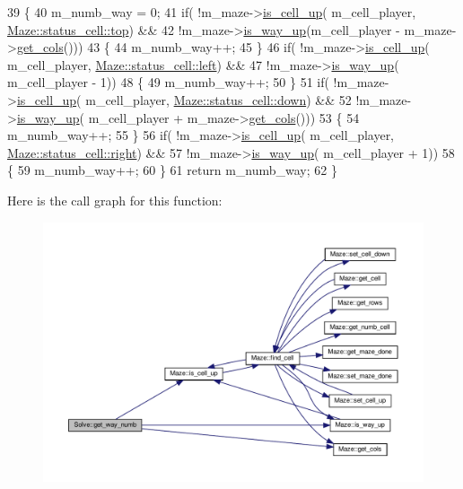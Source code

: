 \begin{DoxyCode}
39 \{
40     m\_numb\_way = 0;
41     \textcolor{keywordflow}{if}( !m\_maze->\hyperlink{classMaze_a2b0e69e72d6c3e1037578f057946a21e}{is\_cell\_up}( m\_cell\_player, \hyperlink{classMaze_a07167e321eac2b67100fb82ecb98f1d1ab28354b543375bfa94dabaeda722927f}{Maze::status\_cell::top}) &&
42             !m\_maze->\hyperlink{classMaze_a308fa695665de6217c0e7f28aab5adda}{is\_way\_up}(m\_cell\_player - m\_maze->\hyperlink{classMaze_a8a04cd1335e96a80358181afa164d4c9}{get\_cols}()))
43     \{
44         m\_numb\_way++;
45     \}
46     \textcolor{keywordflow}{if}( !m\_maze->\hyperlink{classMaze_a2b0e69e72d6c3e1037578f057946a21e}{is\_cell\_up}( m\_cell\_player, \hyperlink{classMaze_a07167e321eac2b67100fb82ecb98f1d1a811882fecd5c7618d7099ebbd39ea254}{Maze::status\_cell::left}) &&
47             !m\_maze->\hyperlink{classMaze_a308fa695665de6217c0e7f28aab5adda}{is\_way\_up}( m\_cell\_player - 1))
48     \{
49         m\_numb\_way++;
50     \}
51     \textcolor{keywordflow}{if}( !m\_maze->\hyperlink{classMaze_a2b0e69e72d6c3e1037578f057946a21e}{is\_cell\_up}( m\_cell\_player, \hyperlink{classMaze_a07167e321eac2b67100fb82ecb98f1d1a74e8333ad11685ff3bdae589c8f6e34d}{Maze::status\_cell::down}) &&
52             !m\_maze->\hyperlink{classMaze_a308fa695665de6217c0e7f28aab5adda}{is\_way\_up}( m\_cell\_player + m\_maze->\hyperlink{classMaze_a8a04cd1335e96a80358181afa164d4c9}{get\_cols}()))
53     \{
54         m\_numb\_way++;
55     \}
56     \textcolor{keywordflow}{if}( !m\_maze->\hyperlink{classMaze_a2b0e69e72d6c3e1037578f057946a21e}{is\_cell\_up}( m\_cell\_player, \hyperlink{classMaze_a07167e321eac2b67100fb82ecb98f1d1a7c4f29407893c334a6cb7a87bf045c0d}{Maze::status\_cell::right}) &&
57             !m\_maze->\hyperlink{classMaze_a308fa695665de6217c0e7f28aab5adda}{is\_way\_up}( m\_cell\_player + 1))
58     \{
59         m\_numb\_way++;
60     \}
61     \textcolor{keywordflow}{return} m\_numb\_way;
62 \}
\end{DoxyCode}
Here is the call graph for this function\+:\nopagebreak
\begin{figure}[H]
\begin{center}
\leavevmode
\includegraphics[width=350pt]{classSolve_aaccff68d3e175f7400a9407077db7255_cgraph}
\end{center}
\end{figure}
